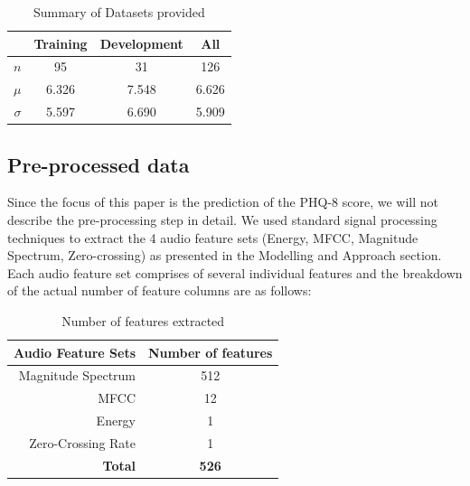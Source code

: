 \documentclass{article}
\begin{document}
 	\begin{table}[h]
 		\begin{center}
  			\begin{tabular}{ | r | c | c | c | }
    			\hline
			 		& \bfseries Training	& \bfseries Development 	& \bfseries All \\ \hline
			 $n$		& 95 			& 31 				& 126 \\ \hline
			 $\mu$	& 6.326 		& 7.548			& 6.626 \\ \hline
			 $\sigma$	& 5.597 		& 6.690 			& 5.909 \\ \hline
			 \end{tabular}
		\end{center}
 	\caption{Summary of Datasets provided}
 	\label{summary_table}
 	\end{table}

	\subsection{Pre-processed data}
	Since the focus of this paper is the prediction of the PHQ-8 score, we will not describe the pre-processing step in detail.
	We used standard signal processing techniques to extract the 4 audio feature sets (Energy, MFCC, Magnitude Spectrum, Zero-crossing) as presented in the Modelling and Approach section.
	Each audio feature set comprises of several individual features and the breakdown of the actual number of feature columns are as follows:

 	\begin{table}[h]
 		\begin{center}
  			\begin{tabular}{ | r | c | }
    			\hline
			 \bfseries Audio Feature Sets 	& \bfseries Number of features \\ \hline
			 Magnitude Spectrum		& 512 \\ \hline
			 MFCC 				& 12 \\ \hline
			 Energy 				& 1 \\ \hline
			 Zero-Crossing Rate 		& 1 \\ \hline
			 \bfseries Total			& \bfseries 526 \\ \hline
			 \end{tabular}
		\end{center}
 	\caption{Number of features extracted}
 	\label{no_features}
 	\end{table}
\end{document}
